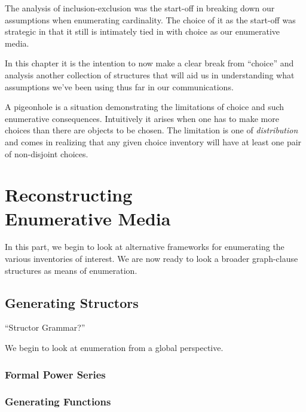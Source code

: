 \documentclass[twoside]{book}
\begin{document}
The analysis of inclusion-exclusion was the start-off in breaking down our assumptions when enumerating cardinality.
The choice of it as the start-off was strategic in that it still is intimately tied in with choice as our enumerative
media.

In this chapter it is the intention to now make a clear break from ``choice'' and analysis another collection of
structures that will aid us in understanding what assumptions we've been using thus far in our communications.

A pigeonhole is a situation demonstrating the limitations of choice and such enumerative consequences.
Intuitively it arises when one has to make more choices than there are objects to be chosen.  The limitation
is one of \emph{distribution} and comes in realizing that any given choice inventory will have at least one
pair of non-disjoint choices.

\part{\texorpdfstring{Reconstructing\\ Enumerative Media}{Reconstructing Enumerative Media}}

In this part, we begin to look at alternative frameworks for enumerating the various inventories of interest.
We are now ready to look a broader graph-clause structures as means of enumeration.

\chapter{Generating Structors}

``Structor Grammar?''

We begin to look at enumeration from a global perspective.

\section{Formal Power Series}

\section{Generating Functions}
\end{document}

